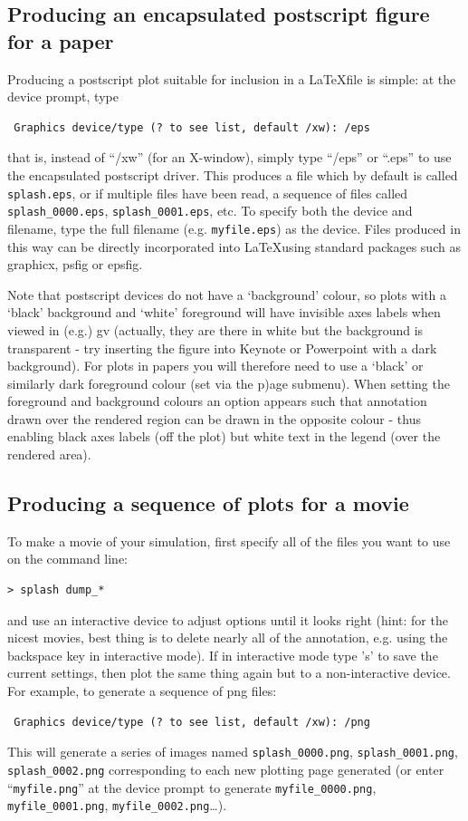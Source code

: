 \documentclass[a4paper,10pt]{article}
\begin{document}
\subsection{Producing an encapsulated postscript figure for a paper}
\label{sec:postscript}
 Producing a postscript plot suitable for inclusion in a \LaTeX  file is simple: at the device prompt, type
\begin{verbatim}
 Graphics device/type (? to see list, default /xw): /eps
\end{verbatim}
that is, instead of ``/xw'' (for an X-window), simply type ``/eps'' or ``.eps'' to use the encapsulated postscript driver. This produces a file which by default is called \verb+splash.eps+, or if multiple files have been read, a sequence of files called \verb+splash_0000.eps+, \verb+splash_0001.eps+, etc. To specify both the device and filename, type the full filename (e.g. \verb+myfile.eps+) as the device. Files produced in this way can be directly incorporated into \LaTeX  using standard packages such as graphicx, psfig or epsfig.

 Note that postscript devices do not have a `background' colour, so plots with a `black' background and `white' foreground will have invisible axes labels when viewed in (e.g.) gv (actually, they are there in white but the background is transparent - try inserting the figure into Keynote or Powerpoint with a dark background). For plots in papers you will therefore need to use a `black' or similarly dark foreground colour (set via the p)age submenu). When setting the foreground and background colours an option appears such that annotation drawn over the rendered region can be drawn in the opposite colour - thus enabling black axes labels (off the plot) but white text in the legend (over the rendered area).

\subsection{Producing a sequence of plots for a movie}
\label{sec:movies} 
 To make a movie of your simulation, first specify all of the files you want to use on the command line:
\begin{verbatim}
> splash dump_*
\end{verbatim}
and use an interactive device to adjust options until it looks right (hint: for the nicest movies, best thing is to delete nearly all of the annotation, e.g. using the backspace key in interactive mode). If in interactive mode type 's' to save the current settings, then plot the same thing again but to a non-interactive device. For example, to generate a sequence of png files:
\begin{verbatim}
 Graphics device/type (? to see list, default /xw): /png
\end{verbatim}
This will generate a series of images named \verb+splash_0000.png+, \verb+splash_0001.png+, \verb+splash_0002.png+ corresponding to each new plotting page generated (or enter ``\verb+myfile.png+'' at the device prompt to generate \verb+myfile_0000.png+, \verb+myfile_0001.png+, \verb+myfile_0002.png+\ldots).
 
\end{document}
